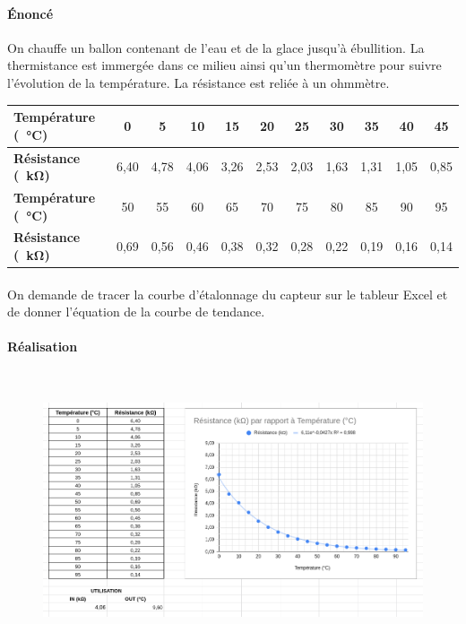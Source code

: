 \documentclass{article}
\begin{document}
\paragraph{Énoncé}
On chauffe un ballon contenant de l'eau et de la glace jusqu'à ébullition. La thermistance est immergée dans ce milieu ainsi qu'un thermomètre pour suivre l'évolution de la température. La résistance est reliée à un ohmmètre.

\begin{table}[H]
    \centering
    \begin{tabular}{l|c|c|c|c|c|c|c|c|c|c}
        \textbf{Température (\SI{}{\celsius})} & 0    & 5    & 10   & 15   & 20   & 25   & 30   & 35   & 40   & 45   \\
        \hline
        \textbf{Résistance (\SI{}{\kilo\ohm})} & 6,40 & 4,78 & 4,06 & 3,26 & 2,53 & 2,03 & 1,63 & 1,31 & 1,05 & 0,85 \\
        \hline
        \textbf{Température (\SI{}{\celsius})} & 50   & 55   & 60   & 65   & 70   & 75   & 80   & 85   & 90   & 95   \\
        \hline
        \textbf{Résistance (\SI{}{\kilo\ohm})} & 0,69 & 0,56 & 0,46 & 0,38 & 0,32 & 0,28  & 0,22 & 0,19 & 0,16 & 0,14 \\
    \end{tabular}
\end{table}

\paragraph{}
On demande de tracer la courbe d'étalonnage du capteur sur le tableur Excel et de donner l'équation de la courbe de tendance.

\paragraph{Réalisation}
\
\begin{figure}[H]
    \centering
    \includegraphics[width=\linewidth]{./images/005-etalonnage-exercice.png}
\end{figure}
\end{document}

